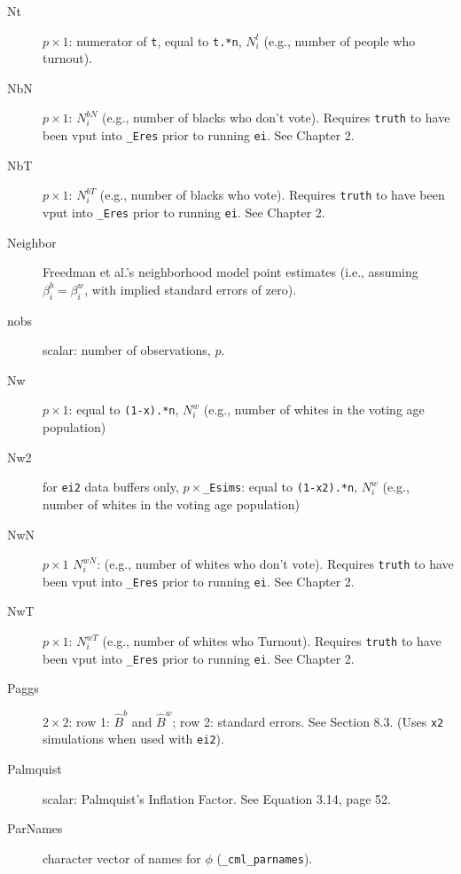 \documentclass[11pt,titlepage]{article}
\newcommand{\NbN}{{N_i^{bN}}}
\newcommand{\NwN}{{N_i^{wN}}}
\newcommand{\Nwp}{{N_i^{w}}}
\newcommand{\NbV}{{N_i^{bT}}}       %
\newcommand{\NwV}{{N_i^{wT}}}
\begin{document}
\begin{description}
\item[Nt] $p\times 1$: numerator of \texttt{t}, equal to
  \texttt{t.*n}, $N^t_i$ (e.g., number of people who turnout).

\item[NbN] $p\times1$: $\NbN$ (e.g., number of blacks who don't vote).
  Requires \texttt{truth} to have been vput into \texttt{\_Eres} prior
  to running \texttt{ei}.  See Chapter 2.

\item[NbT] $p\times1$: $\NbV$ (e.g., number of blacks who vote).
  Requires \texttt{truth} to have been vput into \texttt{\_Eres} prior
  to running \texttt{ei}. See Chapter 2.

\item[Neighbor] Freedman et al.'s neighborhood model point estimates
  (i.e., assuming $\beta_i^b=\beta_i^w$, with implied standard errors
  of zero).

\item[nobs] scalar: number of observations, $p$.

\item[Nw] $p\times 1$: equal to \texttt{(1-x).*n}, $\Nwp$ (e.g.,
  number of whites in the voting age population)

\item[Nw2] for \texttt{ei2} data buffers only,
  $p\times$\texttt{\_Esims}: equal to \texttt{(1-x2).*n}, $\Nwp$
  (e.g., number of whites in the voting age population)

\item[NwN] $p\times1$ $\NwN$: (e.g., number of whites who don't vote).
  Requires \texttt{truth} to have been vput into \texttt{\_Eres} prior
  to running \texttt{ei}.  See Chapter 2.

\item[NwT] $p\times1$: $\NwV$ (e.g., number of whites who Turnout).
  Requires \texttt{truth} to have been vput into \texttt{\_Eres} prior
  to running \texttt{ei}. See Chapter 2.

\item[Paggs] $2\times 2$: row 1: $\hat{B}^b$ and $\hat{B}^w$; row 2:
  standard errors.  See Section 8.3.  (Uses \texttt{x2}
  simulations when used with \texttt{ei2}).

\item[Palmquist] scalar: Palmquist's Inflation Factor.  See Equation
  3.14, page 52.

\item[ParNames] character vector of names for $\phi$
  (\texttt{\_cml\_parnames}).


\end{description}
\end{document}
